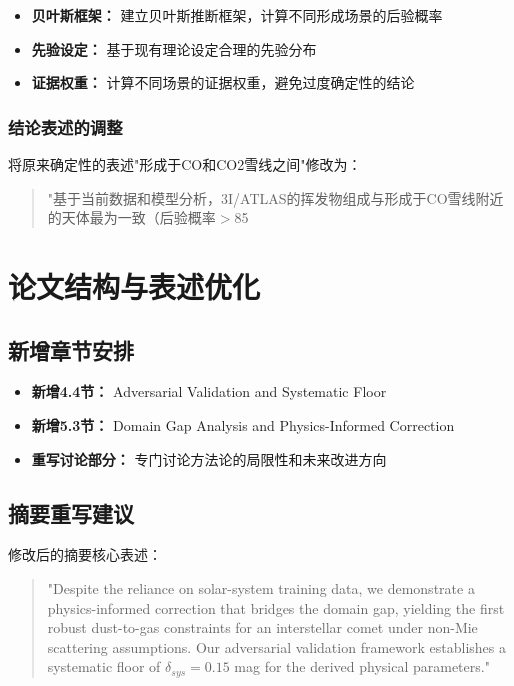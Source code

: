 \documentclass[12pt]{article}
\begin{document}
\begin{itemize}[leftmargin=*]
\item \textbf{贝叶斯框架：} 建立贝叶斯推断框架，计算不同形成场景的后验概率
\item \textbf{先验设定：} 基于现有理论设定合理的先验分布
\item \textbf{证据权重：} 计算不同场景的证据权重，避免过度确定性的结论
\end{itemize}

\subsubsection{结论表述的调整}

将原来确定性的表述"形成于CO和CO2雪线之间"修改为：
\begin{quote}
"基于当前数据和模型分析，3I/ATLAS的挥发物组成与形成于CO雪线附近的天体最为一致（后验概率$>$85%
\end{quote}

\section{论文结构与表述优化}

\subsection{新增章节安排}

\begin{itemize}[leftmargin=*]
\item \textbf{新增4.4节：} Adversarial Validation and Systematic Floor
\item \textbf{新增5.3节：} Domain Gap Analysis and Physics-Informed Correction
\item \textbf{重写讨论部分：} 专门讨论方法论的局限性和未来改进方向
\end{itemize}

\subsection{摘要重写建议}

修改后的摘要核心表述：
\begin{quote}
"Despite the reliance on solar-system training data, we demonstrate a physics-informed correction that bridges the domain gap, yielding the first robust dust-to-gas constraints for an interstellar comet under non-Mie scattering assumptions. Our adversarial validation framework establishes a systematic floor of $\delta_{sys}=0.15$ mag for the derived physical parameters."
\end{quote}
\end{document}
